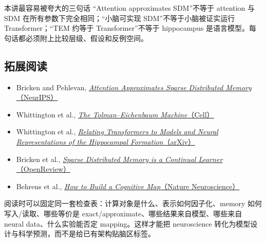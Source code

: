 \documentclass[a4paper]{article}
\begin{document}
\begin{warningbox}{本讲最容易被夸大的三句话}
“Attention approximates SDM”不等于 attention 与 SDM 在所有参数下完全相同；“小脑可实现 SDM”不等于小脑被证实运行 Transformer；“TEM 约等于 Transformer”不等于 hippocampus 是语言模型。每句话都必须附上比较层级、假设和反例空间。
\end{warningbox}

\subsection{拓展阅读}

\begin{itemize}
  \item Bricken and Pehlevan, \href{https://proceedings.neurips.cc/paper/2021/hash/8171ac2c5544a5cb54ac0f38bf477af4-Abstract.html}{\emph{Attention Approximates Sparse Distributed Memory}（NeurIPS）}
  \item Whittington et al., \href{https://www.sciencedirect.com/science/article/pii/S009286742031388X}{\emph{The Tolman--Eichenbaum Machine}（Cell）}
  \item Whittington et al., \href{https://arxiv.org/abs/2112.04035}{\emph{Relating Transformers to Models and Neural Representations of the Hippocampal Formation}（arXiv）}
  \item Bricken et al., \href{https://openreview.net/forum?id=JknGeelZJpHP}{\emph{Sparse Distributed Memory is a Continual Learner}（OpenReview）}
  \item Behrens et al., \href{https://www.nature.com/articles/s41593-022-01153-y}{\emph{How to Build a Cognitive Map}（Nature Neuroscience）}
\end{itemize}

阅读时可以固定同一套检查表：计算对象是什么、表示如何因子化、memory 如何写入/读取、哪些等价是 exact/approximate、哪些结果来自模型、哪些来自 neural data、什么实验能否定 mapping。这样才能把 neuroscience 转化为模型设计与科学预测，而不是给已有架构贴脑区标签。
\end{document}
